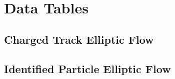 \chapter{Data Tables} %
\label{Data Tables}
\section{Charged Track Elliptic Flow}
\section{Identified Particle Elliptic Flow}
